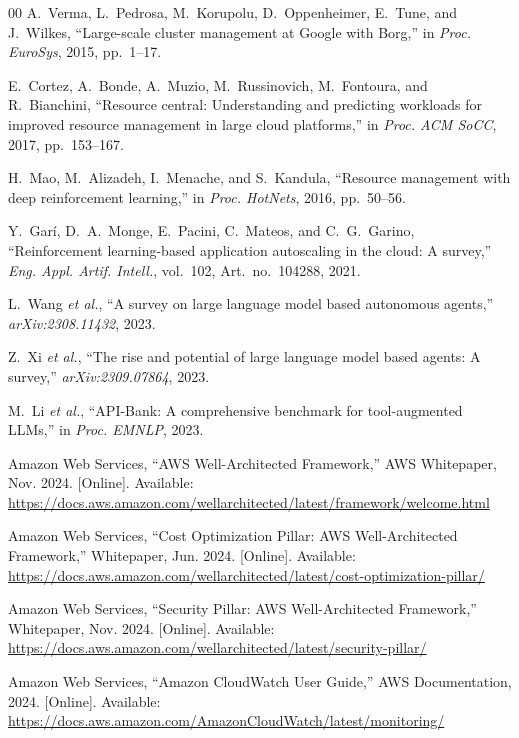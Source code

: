 \documentclass{ieeeaccess}
\begin{document}
\begin{thebibliography}{00}
A.~Verma, L.~Pedrosa, M.~Korupolu, D.~Oppenheimer, E.~Tune, and J.~Wilkes, ``Large-scale cluster management at Google with Borg,'' in \textit{Proc. EuroSys}, 2015, pp.~1--17.

E.~Cortez, A.~Bonde, A.~Muzio, M.~Russinovich, M.~Fontoura, and R.~Bianchini, ``Resource central: Understanding and predicting workloads for improved resource management in large cloud platforms,'' in \textit{Proc. ACM SoCC}, 2017, pp.~153--167.

H.~Mao, M.~Alizadeh, I.~Menache, and S.~Kandula, ``Resource management with deep reinforcement learning,'' in \textit{Proc. HotNets}, 2016, pp.~50--56.

Y.~Gar\'i, D.~A.~Monge, E.~Pacini, C.~Mateos, and C.~G.~Garino, ``Reinforcement learning-based application autoscaling in the cloud: A survey,'' \textit{Eng. Appl. Artif. Intell.}, vol.~102, Art.~no.~104288, 2021.

L.~Wang \textit{et al.}, ``A survey on large language model based autonomous agents,'' \textit{arXiv:2308.11432}, 2023.

Z.~Xi \textit{et al.}, ``The rise and potential of large language model based agents: A survey,'' \textit{arXiv:2309.07864}, 2023.

M.~Li \textit{et al.}, ``API-Bank: A comprehensive benchmark for tool-augmented LLMs,'' in \textit{Proc. EMNLP}, 2023.

Amazon Web Services, ``AWS Well-Architected Framework,'' AWS Whitepaper, Nov. 2024. [Online]. Available: \url{https://docs.aws.amazon.com/wellarchitected/latest/framework/welcome.html}

Amazon Web Services, ``Cost Optimization Pillar: AWS Well-Architected Framework,'' Whitepaper, Jun. 2024. [Online]. Available: \url{https://docs.aws.amazon.com/wellarchitected/latest/cost-optimization-pillar/}

Amazon Web Services, ``Security Pillar: AWS Well-Architected Framework,'' Whitepaper, Nov. 2024. [Online]. Available: \url{https://docs.aws.amazon.com/wellarchitected/latest/security-pillar/}

Amazon Web Services, ``Amazon CloudWatch User Guide,'' AWS Documentation, 2024. [Online]. Available: \url{https://docs.aws.amazon.com/AmazonCloudWatch/latest/monitoring/}


\end{thebibliography}
\end{document}
